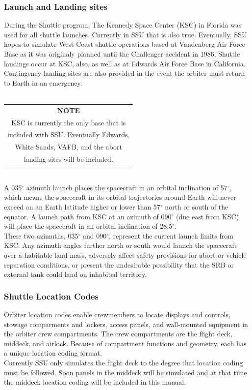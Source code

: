 \documentclass[13pt]{article}
\begin{document}
\begin{multicols}{2}
\subsubsection{\large Launch and Landing sites}
During the Shuttle program, The Kennedy Space Center (KSC) in Florida was used for all shuttle launches. Currently in SSU that is also true. Eventually, SSU hopes to simulate West Coast shuttle operations based at Vandenberg Air Force Base as it was originaly planned until the Challenger accident in 1986. Shuttle landings occur at KSC, also, as well as at Edwards Air Force Base in California. Contingency landing sites are also provided in the event the orbiter must return to Earth in an emergency.\\
\\
\begin{tabular}{c}
	\bfseries NOTE\\[0.3cm] KSC is currently the only base that is\\ included with SSU.  Eventually Edwards,\\ White Sands, VAFB, and the abort\\ landing sites will be included.
\end{tabular}
\\[0.5cm]
A 035$^{\circ}$ azimuth launch places the spacecraft in an orbital inclination of 57$^{\circ}$, which means the spacecraft in its orbital trajectories around Earth will never exceed an an Earth latitude higher or lower than 57$^{\circ}$ north or south of the equator. A launch path from KSC at an azimuth of 090$^{\circ}$ (due east from KSC) will place the spacecraft in an orbital inclination of 28.5$^{\circ}$.
\\
These two azimuths, 035$^{\circ}$ and 090$^{\circ}$, represent the current launch limits from KSC. Any azimuth angles further north or south would launch the spacecraft over a habitable land mass, adversely affect safety provisions for abort or vehicle separation conditions, or present the undesirable possibility that the SRB or external tank could land on inhabited territory.
\\
\subsubsection{\large Shuttle Location Codes}
Orbiter location codes enable crewmembers to locate displays and controls, stowage comparments and lockers, access panels, and wall-mounted equipment in the orbiter crew compartments. The crew compartments are the flight deck, middeck, and airlock. Because of compartment functions and geometry, each has a unique location coding format.
\\
Currently SSU only simulates the flight deck to the degree that location coding must be followed. Soon panels in the middeck will be simulated and at that time the middeck location coding will be included in this manual.
\\

\end{multicols}
\end{document}
